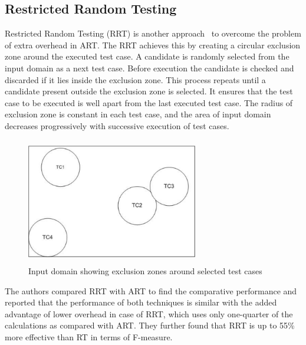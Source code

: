 \subsection{Restricted Random Testing}
Restricted Random Testing (RRT) is another approach~\cite{chan2006restricted} to overcome the problem of extra overhead in ART. The RRT achieves this by creating a circular exclusion zone around the executed test case. A candidate is randomly selected from the input domain as a next test case. Before execution the candidate is checked and discarded if it lies inside the exclusion zone. This process repeats until a candidate present outside the exclusion zone is selected. It ensures that the test case to be executed is well apart from the last executed test case. The radius of exclusion zone is constant in each test case, and the area of input domain decreases progressively with successive execution of test cases.
\bigskip
\bigskip
\begin{figure}[h]
	\centering
	\includegraphics[width= 7.5cm, height = 5.5cm]{chapter2/RRT.pdf}
	\bigskip
	\caption{Input domain showing exclusion zones around selected test cases}
\end{figure}
\bigskip

The authors compared RRT with ART to find the comparative performance and reported that the performance of both techniques is similar with the added advantage of lower overhead in case of RRT, which uses only one-quarter of the calculations as compared with ART. %
They further found that RRT is up to 55\% more effective than RT in terms of F-measure.




